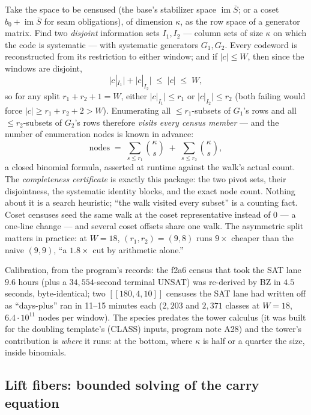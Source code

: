\documentclass[11pt]{article}
\theoremstyle{plain}
\theoremstyle{definition}
\theoremstyle{remark}
\newcommand{\wt}[1]{\lvert #1\rvert}
\newcommand{\ov}[1]{\overline{#1}}
\begin{document}
Take the space to be censused (the base's stabilizer space
$\operatorname{im} \ov S$; or a coset $b_0 + \operatorname{im}\ov S$ for
seam obligations), of dimension $\kappa$, as the row space of a
generator matrix. Find two \emph{disjoint} information sets $I_1, I_2$
--- column sets of size $\kappa$ on which the code is systematic --- with
systematic generators $G_1, G_2$. Every codeword is reconstructed from
its restriction to either window; and if $\wt c \leq W$, then since the
windows are disjoint,
\[
\wt{c|_{I_1}} + \wt{c|_{I_2}} \;\leq\; \wt c \;\leq\; W,
\]
so for any split $r_1 + r_2 + 1 = W$, either $\wt{c|_{I_1}} \leq r_1$ or
$\wt{c|_{I_2}} \leq r_2$ (both failing would force $\wt c \geq r_1 + r_2
+ 2 > W$). Enumerating all $\leq r_1$-subsets of $G_1$'s rows and all
$\leq r_2$-subsets of $G_2$'s rows therefore \emph{visits every census
member} --- and the number of enumeration nodes is known in advance:
\[
\text{nodes} \;=\; \sum_{s \leq r_1}\binom{\kappa}{s} \;+\;
\sum_{s \leq r_2}\binom{\kappa}{s},
\]
a closed binomial formula, asserted at runtime against the walk's actual
count. The \emph{completeness certificate} is exactly this package:
the two pivot sets, their disjointness, the systematic identity blocks,
and the exact node count. Nothing about it is a search heuristic;
``the walk visited every subset'' is a counting fact. Coset censuses
seed the same walk at the coset representative instead of $0$ --- a
one-line change --- and several coset offsets share one walk. The
asymmetric split matters in practice: at $W = 18$, $(r_1, r_2) = (9,8)$
runs $9\times$ cheaper than the naive $(9,9)$, ``a $1.8\times$ cut by
arithmetic alone.''

Calibration, from the program's records: the f2a6 census that took the
SAT lane $9.6$ hours (plus a $34{,}554$-second terminal UNSAT) was
re-derived by BZ in $4.5$ seconds, byte-identical; two $[[180,4,10]]$
censuses the SAT lane had written off as ``days-plus'' ran in 11--15
minutes each ($2{,}203$ and $2{,}371$ classes at $W = 18$, $6.4\cdot
10^{11}$ nodes per window). The species predates the tower calculus (it
was built for the doubling template's (CLASS) inputs, program note A28)
and the tower's contribution is \emph{where} it runs: at the bottom,
where $\kappa$ is half or a quarter the size, inside binomials.

\subsection{Lift fibers: bounded solving of the carry equation}
\label{sec:fibers}
\end{document}
